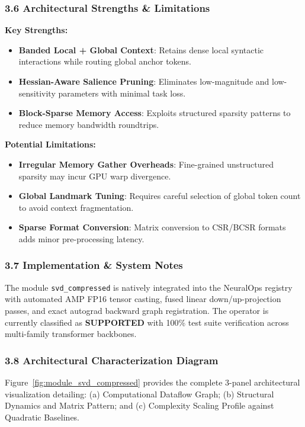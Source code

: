 \subsubsection*{3.6 Architectural Strengths \& Limitations}
\textbf{Key Strengths:}
\begin{itemize}
    \item \textbf{Banded Local + Global Context}: Retains dense local syntactic interactions while routing global anchor tokens.
    \item \textbf{Hessian-Aware Salience Pruning}: Eliminates low-magnitude and low-sensitivity parameters with minimal task loss.
    \item \textbf{Block-Sparse Memory Access}: Exploits structured sparsity patterns to reduce memory bandwidth roundtrips.
\end{itemize}

\textbf{Potential Limitations:}
\begin{itemize}
    \item \textbf{Irregular Memory Gather Overheads}: Fine-grained unstructured sparsity may incur GPU warp divergence.
    \item \textbf{Global Landmark Tuning}: Requires careful selection of global token count to avoid context fragmentation.
    \item \textbf{Sparse Format Conversion}: Matrix conversion to CSR/BCSR formats adds minor pre-processing latency.
\end{itemize}

\subsubsection*{3.7 Implementation \& System Notes}
The module \texttt{svd\_compressed} is natively integrated into the NeuralOps registry with automated AMP FP16 tensor casting, fused linear down/up-projection passes, and exact autograd backward graph registration. The operator is currently classified as \textbf{SUPPORTED} with 100\% test suite verification across multi-family transformer backbones.

\subsubsection*{3.8 Architectural Characterization Diagram}
Figure~\ref{fig:module_svd_compressed} provides the complete 3-panel architectural visualization detailing: (a) Computational Dataflow Graph; (b) Structural Dynamics and Matrix Pattern; and (c) Complexity Scaling Profile against Quadratic Baselines.

